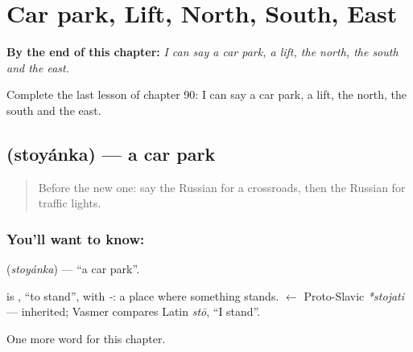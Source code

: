 
\chapter{Car park, Lift, North, South, East}
\label{ch:ru-car-park-lift-north-south-east}

\begin{chapteropening}
\textbf{By the end of this chapter:} \emph{I can say a car park, a lift, the north, the south and the east.}

Complete the last lesson of chapter 90: I can say a car park, a lift, the north, the south and the east.
\end{chapteropening}

\section[\texorpdfstring{\ru{стоянка} (stoyánka)}{стоянка (stoyánka)}]{ (stoyánka) — a car park}

\label{lesson:RU-C90-car-park}



\begin{quote}
Before the new one: say the Russian for a crossroads, then the Russian for traffic lights.
\end{quote}

\subsection*{You'll want to know: }
\textbf{} (\emph{stoyánka}) — \textquotedblleft{}a car park\textquotedblright{}.

\begin{cousinweb}
\textbf{} is \emph{}, \textquotedblleft{}to stand\textquotedblright{}, with \emph{-}: a place where something stands. \emph{} $\leftarrow$ Proto-Slavic \emph{*stojati} — inherited; Vasmer compares Latin \emph{stō}, \textquotedblleft{}I stand\textquotedblright{}.
\end{cousinweb}

\begin{grammarlens}[title={What you've built}]
One more word for this chapter.
\end{grammarlens}


